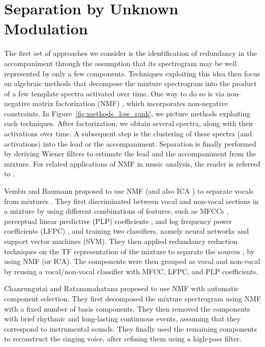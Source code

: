 \chapter{Separation by Unknown Modulation}




The first set of approaches we consider is the identification of redundancy in the accompaniment through the assumption that its spectrogram may be well represented by only a few components. Techniques exploiting this idea then focus on algebraic methods that decompose the mixture spectrogram into the product of a few template spectra activated over time. One way to do so is via non-negative matrix factorization (NMF) \cite{lee99,lee01}, which incorporates non-negative constraints. In Figure~\ref{fig:methods_low_rank}, we picture methods exploiting such techniques. After factorization, we obtain several spectra, along with their activations over time. A subsequent step is the clustering of these spectra (and activations) into the lead or the accompaniment. Separation is finally performed by deriving Wiener filters to estimate the lead and the accompaniment from the mixture. For related applications of NMF in music analysis, the reader is referred to \cite{smaragdis03,virtanen07,fevotte09}.

Vembu and Baumann proposed to use NMF (and also ICA \cite{common94}) to separate vocals from mixtures \cite{vembu05}. They first discriminated between vocal and non-vocal sections in a mixture by using different combinations of features, such as MFCCs \cite{david80}, perceptual linear predictive (PLP) coefficients \cite{hermansky90}, and log frequency power coefficients (LFPC) \cite{nwe04}, and training two classifiers, namely neural networks and support vector machines (SVM). They then applied redundancy reduction techniques on the TF representation of the mixture to separate the sources \cite{casey00}, by using NMF (or ICA). The components were then grouped as vocal and non-vocal by reusing a vocal/non-vocal classifier with MFCC, LFPC, and PLP coefficients.

Chanrungutai and Ratanamahatana proposed to use NMF with automatic component selection\cite{chanrungutai08,chanrungutai082}. They first decomposed the mixture spectrogram using NMF with a fixed number of basis components. They then removed the components with brief rhythmic and long-lasting continuous events, assuming that they correspond to instrumental sounds. They finally used the remaining components to reconstruct the singing voice, after refining them using a high-pass filter.

